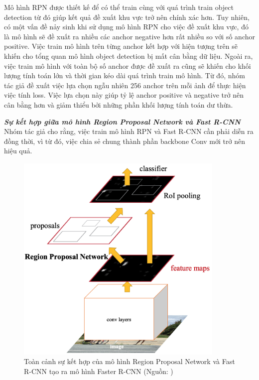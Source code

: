 {    \noindent
    Mô hình RPN được thiết kế để có thể train cùng với quá trình train object detection từ đó giúp kết quả đề xuất khu vực trở nên chính xác hơn.
    Tuy nhiên, có một vấn đề nảy sinh khi sử dụng mô hình RPN cho việc đề xuất khu vực, đó là mô hình sẽ đề xuất ra nhiều các anchor negative hơn rất nhiều so với số anchor positive.
    Việc train mô hình trên từng anchor kết hợp với hiện tượng trên sẽ khiến cho tổng quan mô hình object detection bị mất cân bằng dữ liệu.
    Ngoài ra, việc train mô hình với toàn bộ số anchor được đề xuất ra cũng sẽ khiến cho khối lượng tính toán lớn và thời gian kéo dài quá trình train mô hình.
    Từ đó, nhóm tác giả đề xuất việc lựa chọn ngẫu nhiên 256 anchor trên mỗi ảnh để thực hiện việc tính loss. Việc lựa chọn này giúp tỷ lệ anchor positive và negative trở nên cân bằng hơn và giảm thiểu bởi những phần khối lượng tính toán dư thừa.

    \noindent
    \textbf{\textit{Sự kết hợp giữa mô hình Region Proposal Network và Fast R-CNN}} \\
    Nhóm tác giả cho rằng, việc train mô hình RPN và Fast R-CNN cần phải diễn ra đồng thời, vì từ đó, việc chia sẻ chung thành phần backbone Conv mới trở nên hiệu quả.

    \begin{figure}[H]
        \centering
        \includegraphics[width=10cm] {images/faster_rcnn_model}
        \caption{Toàn cảnh sự kết hợp của mô hình Region Proposal Network và Fast R-CNN tạo ra mô hình Faster R-CNN (Nguồn: \cite{ren2015faster})}
        \label{fig:faster_model}
    \end{figure}

}
